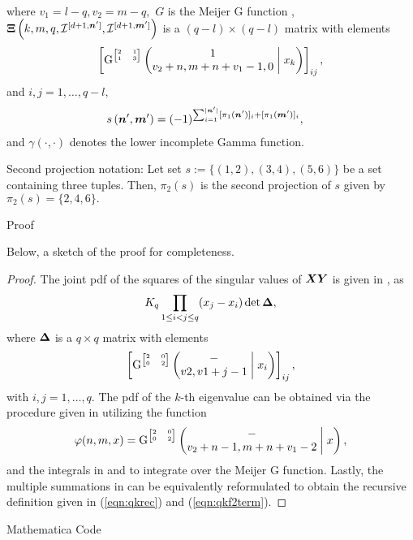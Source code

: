 \begin{theorem}
\begin{figure*}
\begin{align}
		\end{align}
		\hrulefill
	\end{figure*}
	where $v_1=l-q, v_2=m-q,$ $G$ is the Meijer G function \cite{Olver2010}, $\boldsymbol{\Xi}\left(k, m, q, {\mathcal{I}}^{[d+1,\boldsymbol{n}']},{\mathcal{I}}^{[d+1,\boldsymbol{m}']}\right)$ is a $(q-l)\times (q-l)$ matrix with elements 
	\begin{equation}
		\left[\mathrm{G}^{\tiny\begin{bmatrix} 2&1\\1&3 \end{bmatrix}}\left(\begin{matrix} 1 \\ v_2+n,m+n+v_1-1,0 \end{matrix}\;\middle|\;x_k\right)\right]_{ij}, \label{eqn:qkf2mat}
	\end{equation}
	and $i,j=1,\dots,q-l,$
	\begin{align}
		s\left(\boldsymbol{n}',\boldsymbol{m}'\right) &= (-1)^{\sum_{i=1}^{|\boldsymbol{n}'|} [\pi_1(\boldsymbol{n}')]_i + [\pi_1(\boldsymbol{m}')]_i},
	\end{align}
	and $\gamma(\cdot,\cdot)$ denotes the lower incomplete Gamma function.
\end{theorem}

Second projection notation: Let set $s := \{(1,2), (3,4), (5,6)\}$ be a set containing three tuples. Then, $\pi_2(s)$ is the second projection of $s$ given by $\pi_2(s) = \{2, 4, 6\}.$

Proof

Below, a sketch of the proof for completeness.

\begin{proof}
	The joint pdf of the squares of the singular values of $\boldsymbol{X}\boldsymbol{Y}$ is given in \cite[(18)]{Akemann2013},\cite{Ipsen2015} as
	\begin{align}
		K_q \prod_{1\leq i < j \leq q} (x_j-x_i) \det{\boldsymbol{\Delta}},
	\end{align}
	where $\boldsymbol{\Delta}$ is a $q \times q$ matrix with elements
	\begin{equation}
		\left[\mathrm{G}^{\tiny\begin{bmatrix} 2&0\\0&2 \end{bmatrix}}\left(\begin{matrix} - \\ v2,v1+j-1 \end{matrix}\;\middle|\;x_i\right)\right]_{ij},
	\end{equation}
	with $i,j=1,\dots,q.$ The pdf of the $k$-th eigenvalue can be obtained via the procedure given in \cite[Sec. IV-B]{Zanella2009} utilizing the function
	\begin{equation}
		\varphi(n,m,x) = \mathrm{G}^{\tiny\begin{bmatrix} 2&0\\0&2 \end{bmatrix}}\left(\begin{matrix} - \\ v_2+n-1, m+n+v_1-2 \end{matrix}\;\middle|\;x\right),
	\end{equation}
	and the integrals in \cite[(A7)]{Akemann2013} and \cite{Olver2010} to integrate over the Meijer G function. Lastly, the multiple summations in \cite[Sec. IV-B]{Zanella2009} can be equivalently reformulated to obtain the recursive definition given in (\ref{eqn:qkrec}) and (\ref{eqn:qkf2term}).
\end{proof}

Mathematica Code

